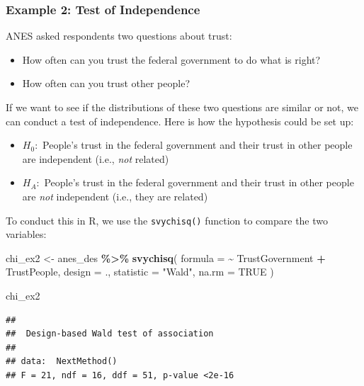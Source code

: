\documentclass[
]{krantz}
\makeatletter
\newenvironment{Shaded}{\begin{snugshade}}{\end{snugshade}}
\newcommand{\AttributeTok}[1]{\textcolor[rgb]{0.27,0.27,0.27}{#1}}
\newcommand{\ConstantTok}[1]{\textcolor[rgb]{0.37,0.37,0.37}{#1}}
\newcommand{\FunctionTok}[1]{\textcolor[rgb]{0.27,0.27,0.27}{\textbf{#1}}}
\newcommand{\NormalTok}[1]{#1}
\newcommand{\OtherTok}[1]{\textcolor[rgb]{0.37,0.37,0.37}{#1}}
\newcommand{\SpecialCharTok}[1]{\textcolor[rgb]{0.43,0.43,0.43}{\textbf{#1}}}
\newcommand{\StringTok}[1]{\textcolor[rgb]{0.5,0.5,0.5}{#1}}
\providecommand{\tightlist}{%
  \setlength{\itemsep}{0pt}\setlength{\parskip}{0pt}}
\newenvironment{kframe}{%
\medskip{}
\setlength{\fboxsep}{.8em}
 \def\at@end@of@kframe{}%
 \ifinner\ifhmode%
  \def\at@end@of@kframe{\end{minipage}}%
  \begin{minipage}{\columnwidth}%
 \fi\fi%
 \def\FrameCommand##1{\hskip\@totalleftmargin \hskip-\fboxsep
 \colorbox{shadecolor}{##1}\hskip-\fboxsep
     \hskip-\linewidth \hskip-\@totalleftmargin \hskip\columnwidth}%
 \MakeFramed {\advance\hsize-\width
   \@totalleftmargin\z@ \linewidth\hsize
   \@setminipage}}%
 {\par\unskip\endMakeFramed%
 \at@end@of@kframe}
\renewenvironment{Shaded}{\begin{kframe}}{\end{kframe}}
\makeatother
\begin{document}
\hypertarget{stattest-chi-ex2}{%
\subsubsection*{Example 2: Test of Independence}\label{stattest-chi-ex2}}


ANES asked respondents two questions about trust:

\begin{itemize}
\tightlist
\item
  How often can you trust the federal government to do what is right?
\item
  How often can you trust other people?
\end{itemize}

If we want to see if the distributions of these two questions are similar or not, we can conduct a test of independence. Here is how the hypothesis could be set up:

\begin{itemize}
\tightlist
\item
  \(H_0:\) People's trust in the federal government and their trust in other people are independent (i.e., \emph{not} related)
\item
  \(H_A:\) People's trust in the federal government and their trust in other people are \emph{not} independent (i.e., they are related)
\end{itemize}

To conduct this in R, we use the \texttt{svychisq()} function to compare the two variables:

\begin{Shaded}
\begin{Highlighting}[]
\NormalTok{chi\_ex2 }\OtherTok{\textless{}{-}}\NormalTok{ anes\_des }\SpecialCharTok{\%\textgreater{}\%}
  \FunctionTok{svychisq}\NormalTok{(}
    \AttributeTok{formula =} \SpecialCharTok{\textasciitilde{}}\NormalTok{ TrustGovernment }\SpecialCharTok{+}\NormalTok{ TrustPeople,}
    \AttributeTok{design =}\NormalTok{ .,}
    \AttributeTok{statistic =} \StringTok{"Wald"}\NormalTok{,}
    \AttributeTok{na.rm =} \ConstantTok{TRUE}
\NormalTok{  )}

\NormalTok{chi\_ex2}
\end{Highlighting}
\end{Shaded}

\begin{verbatim}
## 
##  Design-based Wald test of association
## 
## data:  NextMethod()
## F = 21, ndf = 16, ddf = 51, p-value <2e-16
\end{verbatim}
\end{document}
